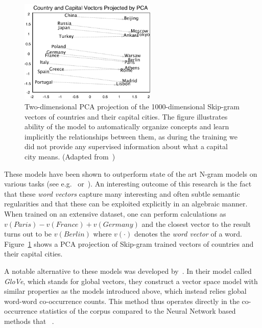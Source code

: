 \begin{figure}
  \begin{center}
    \includegraphics[width=0.58\textwidth]{img/word2vec_cities.pdf}
  \end{center}
  \caption{Two-dimensional PCA projection of the 1000-dimensional Skip-gram vectors of countries and their capital cities. The figure illustrates ability of the model to automatically organize concepts and learn implicitly the relationships between them, as during the training we did not provide any supervised information about what a capital city means. (Adapted from~\cite{Mikolov:2013ac})}
\label{fig:word2vec-cities}
\end{figure}

These models have been shown to outperform state of the art N-gram models on various tasks (see e.g.~\cite{bengio2003neural} or~\cite{Mikolov:2012aa}). An interesting outcome of this research is the fact that these \emph{word vectors} capture many interesting and often subtle semantic regularities and that these can be exploited explicitly in an algebraic manner. When trained on an extensive dataset, one can perform calculations as $v(Paris) - v(France) + v(Germany)$ and the closest vector to the result turns out to be $v(Berlin)$ where $v(\cdot)$ denotes the \emph{word vector} of a word. Figure~\ref{fig:word2vec-cities} shows a PCA projection of Skip-gram trained vectors of countries and their capital cities.

A notable alternative to these models was developed by~\cite{Pennington:2014aa}. In their model called \emph{GloVe}, which stands for global vectors, they construct a vector space model with similar properties as the models introduced above, which instead relies global word-word co-occurrence counts. This method thus operates directly in the co-occurrence statistics of the corpus compared to the Neural Network based methods that ~\cite{Pennington:2014aa}.

